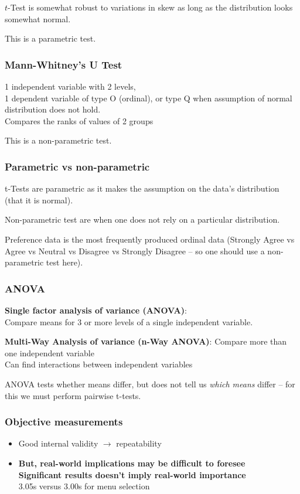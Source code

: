 $t$-Test is somewhat robust to variations in skew as long as the distribution looks somewhat normal.

This is a parametric test.

\subsubsection{Mann-Whitney's U Test}
1 independent variable with 2 levels,\\
1 dependent variable of type O (ordinal), or type Q 
when assumption of normal distribution does not hold.\\
Compares the ranks of values of 2 groups

This is a non-parametric test.

\subsubsection{Parametric vs non-parametric}
t-Tests are parametric as it makes the assumption on the data's distribution (that it is normal). 

Non-parametric test are when one does not rely on a particular distribution.

Preference data is the most frequently produced ordinal data (Strongly Agree vs Agree vs Neutral vs Disagree vs Strongly Disagree -- so one should use a non-parametric test here).

\subsubsection{ANOVA}
\textbf{Single factor analysis of variance (ANOVA)}:\\
Compare means for 3 or more levels of a single independent variable.

\textbf{Multi-Way Analysis of variance (n-Way ANOVA)}:
Compare more than one independent variable\\
Can find interactions between independent variables

ANOVA tests whether means differ, but does not tell us \textit{which means} differ -- for this we must perform pairwise t-tests.

\subsubsection{Objective measurements}
\begin{itemize}
    \item Good internal validity $\to$ repeatability
    \item \textbf{But, real-world implications may be difficult to foresee\\
Significant results doesn’t imply real-world importance}\\
3.05s versus 3.00s for menu selection
\end{itemize}
